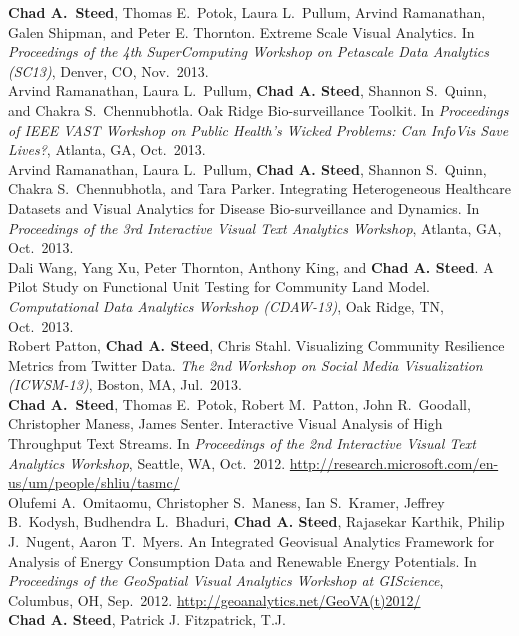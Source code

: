 \documentclass[11pt, letterpaper]{article}
\newcommand{\years}[1]{\marginnote{\scriptsize #1}}
\begin{document}
\begin{sloppypar}
\years{2013}\textbf{Chad A.\ Steed}, Thomas E.\ Potok, Laura L.\ Pullum,
Arvind Ramanathan, Galen Shipman, and Peter E. Thornton. Extreme Scale Visual Analytics.
In \emph{Proceedings of the 4th SuperComputing Workshop on Petascale Data Analytics (SC13)},
Denver, CO, Nov.\ 2013.\\
\years{2013}Arvind Ramanathan, Laura L.\ Pullum, \textbf{Chad A. Steed},
Shannon S.\ Quinn, and Chakra S.\ Chennubhotla. Oak Ridge Bio-surveillance Toolkit.
In \emph{Proceedings of IEEE VAST Workshop on Public Health's Wicked Problems:
Can InfoVis Save Lives?}, Atlanta, GA, Oct.\ 2013.\\
\years{2013}Arvind Ramanathan, Laura L.\ Pullum, \textbf{Chad A. Steed},
Shannon S.\ Quinn, Chakra S.\ Chennubhotla, and Tara Parker.
Integrating Heterogeneous Healthcare Datasets and Visual Analytics for Disease
Bio-surveillance and Dynamics. In \emph{Proceedings of the 3rd Interactive
Visual Text Analytics Workshop}, Atlanta, GA, Oct.\ 2013.\\
\years{2013}Dali Wang, Yang Xu, Peter Thornton, Anthony King,
and \textbf{Chad A. Steed}. A Pilot Study on Functional Unit Testing for
Community Land Model. \emph{Computational Data Analytics Workshop (CDAW-13)},
Oak Ridge, TN, Oct.\ 2013.\\
\years{2013}Robert Patton, \textbf{Chad A. Steed}, Chris Stahl.
Visualizing Community Resilience Metrics from Twitter Data. \emph{The 2nd Workshop
on Social Media Visualization (ICWSM-13)}, Boston, MA, Jul.\ 2013.\\
\years{2012}\textbf{Chad A.\ Steed}, Thomas E.\ Potok, Robert M.\ Patton,
John R.\ Goodall, Christopher Maness, James Senter.  Interactive Visual Analysis
of High Throughput Text Streams. In \emph{Proceedings of the 2nd Interactive
Visual Text Analytics Workshop}, Seattle, WA, Oct.\ 2012.
\href{http://research.microsoft.com/en-us/um/people/shliu/tasmc/}
{http://research.microsoft.com/en-us/um/people/shliu/tasmc/}\\
\years{2012}Olufemi A.\ Omitaomu, Christopher S.\ Maness, Ian S.\ Kramer,
Jeffrey B.\ Kodysh, Budhendra L.\ Bhaduri, \textbf{Chad A. Steed},
Rajasekar Karthik, Philip J.\ Nugent, Aaron T.\ Myers. An Integrated Geovisual
Analytics Framework for Analysis of Energy Consumption Data and Renewable
Energy Potentials. In \emph{Proceedings of the GeoSpatial Visual Analytics Workshop at
GIScience}, Columbus, OH, Sep.\ 2012.
\href{http://geoanalytics.net/GeoVA(t)2012/}{http://geoanalytics.net/GeoVA(t)2012/}\\
\years{2009}\textbf{Chad A. Steed}, Patrick J. Fitzpatrick, T.J.

\end{sloppypar}
\end{document}

